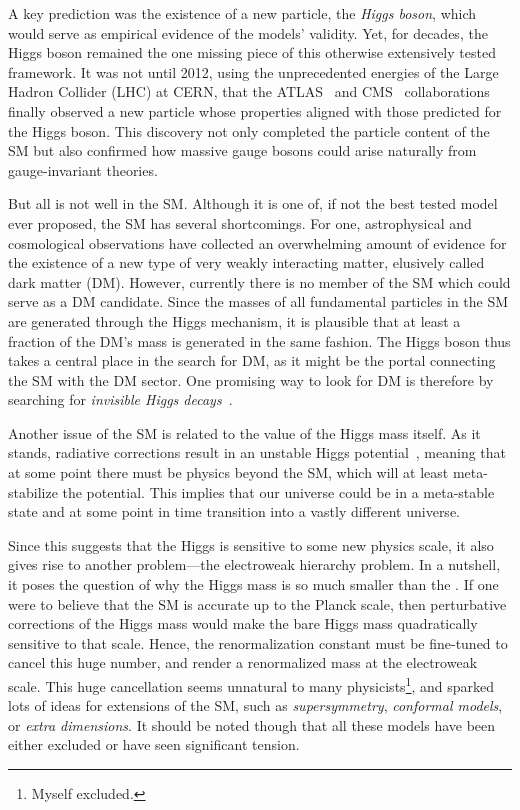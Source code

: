 A key prediction was the existence of a new particle, the \textit{Higgs boson}, which would serve as empirical evidence of the models' validity. Yet, for decades, the Higgs boson remained the one missing piece of this otherwise extensively tested framework. It was not until 2012, using the unprecedented energies of the Large Hadron Collider (\acs{LHC}) at CERN, that the ATLAS~\cite{ATLAS:2012yve} and CMS~\cite{CMS:2012qbp} collaborations finally observed a new particle whose properties aligned with those predicted for the Higgs boson. This discovery not only completed the particle content of the \acs{SM} but also confirmed how massive gauge bosons could arise naturally from gauge-invariant theories.

But all is not well in the \acs{SM}. Although it is one of, if not the best tested model ever proposed, the \acs{SM} has several shortcomings. For one, astrophysical and cosmological observations have collected an overwhelming amount of evidence for the existence of a new type of very weakly interacting matter, elusively called dark matter (\acs{DM}). However, currently there is no member of the \acs{SM} which could serve as a \acs{DM} candidate. Since the masses of all fundamental particles in the \acs{SM} are generated through the Higgs mechanism, it is plausible that at least a fraction of the \acs{DM}'s mass is generated in the same fashion. The Higgs boson thus takes a central place in the search for \acs{DM}, as it might be the portal connecting the \acs{SM} with the \acs{DM} sector. One promising way to look for \acs{DM} is therefore by searching for \textit{invisible Higgs decays}~\cite{ATLAS:2017nyv, CMS:2016dhk}.

Another issue of the \acs{SM} is related to the value of the Higgs mass itself. As it stands, radiative corrections result in an unstable Higgs potential~\cite{Degrassi:2012ry}, meaning that at some point there must be physics beyond the \acs{SM}, which will at least meta-stabilize the potential. This implies that our universe could be in a meta-stable state and at some point in time transition into a vastly different universe.

Since this suggests that the Higgs is sensitive to some new physics scale, it also gives rise to another problem---the electroweak hierarchy problem. In a nutshell, it poses the question of why the Higgs mass is so much smaller than the . If one were to believe that the \acs{SM} is accurate up to the Planck scale, then perturbative corrections of the Higgs mass would make the bare Higgs mass quadratically sensitive to that scale. Hence, the renormalization constant must be fine-tuned to cancel this huge number, and render a renormalized mass at the electroweak scale. This huge cancellation seems unnatural to many physicists\footnote{Myself excluded.}, and sparked lots of ideas for extensions of the \acs{SM}, such as \textit{supersymmetry}, \textit{conformal models}, or \textit{extra dimensions}. It should be noted though that all these models have been either excluded or have seen significant tension.

